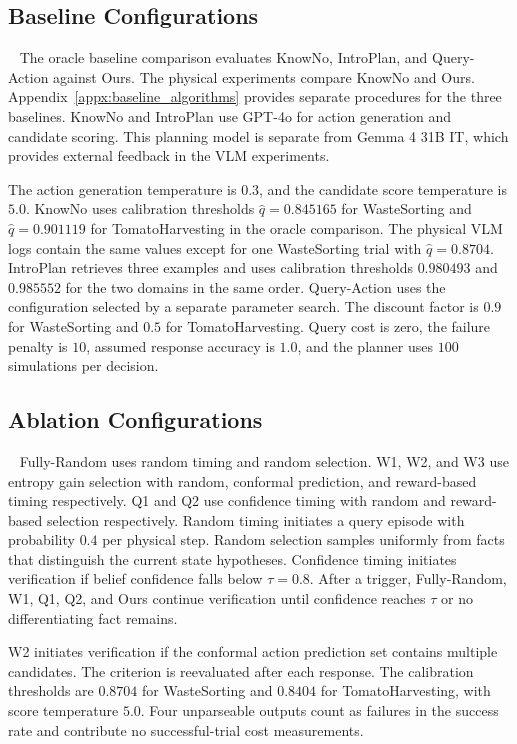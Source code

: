\subsection{Baseline Configurations}~\label{appx:baseline_configs}
The oracle baseline comparison evaluates KnowNo, IntroPlan, and Query-Action against Ours. The physical experiments compare KnowNo and Ours. Appendix~\ref{appx:baseline_algorithms} provides separate procedures for the three baselines. KnowNo and IntroPlan use GPT-4o for action generation and candidate scoring. This planning model is separate from Gemma 4 31B IT, which provides external feedback in the VLM experiments.

The action generation temperature is $0.3$, and the candidate score temperature is $5.0$. KnowNo uses calibration thresholds $\hat{q}=0.845165$ for WasteSorting and $\hat{q}=0.901119$ for TomatoHarvesting in the oracle comparison. The physical VLM logs contain the same values except for one WasteSorting trial with $\hat{q}=0.8704$. IntroPlan retrieves three examples and uses calibration thresholds $0.980493$ and $0.985552$ for the two domains in the same order. Query-Action uses the configuration selected by a separate parameter search. The discount factor is $0.9$ for WasteSorting and $0.5$ for TomatoHarvesting. Query cost is zero, the failure penalty is $10$, assumed response accuracy is $1.0$, and the planner uses $100$ simulations per decision.

\subsection{Ablation Configurations}~\label{appx:ablation_configs}
Fully-Random uses random timing and random selection. W1, W2, and W3 use entropy gain selection with random, conformal prediction, and reward-based timing respectively. Q1 and Q2 use confidence timing with random and reward-based selection respectively. Random timing initiates a query episode with probability $0.4$ per physical step. Random selection samples uniformly from facts that distinguish the current state hypotheses. Confidence timing initiates verification if belief confidence falls below $\tau=0.8$. After a trigger, Fully-Random, W1, Q1, Q2, and Ours continue verification until confidence reaches $\tau$ or no differentiating fact remains.

W2 initiates verification if the conformal action prediction set contains multiple candidates. The criterion is reevaluated after each response. The calibration thresholds are $0.8704$ for WasteSorting and $0.8404$ for TomatoHarvesting, with score temperature $5.0$. Four unparseable outputs count as failures in the success rate and contribute no successful-trial cost measurements.

